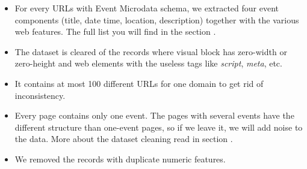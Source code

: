 \begin{itemize}
    \item For every URLs with Event Microdata schema, we extracted four event components (title, date time, location, description) together with the various web features. The full list you will find in the section . 
    \item The dataset is cleared of the records where visual block has zero-width or zero-height and web elements with the useless tags like \textit{script}, \textit{meta}, etc.
    \item It contains at most 100 different URLs for one domain to get rid of inconsistency. 
    \item Every page contains only one event. The pages with several events have the different structure than one-event pages, so if we leave it, we will add noise to the data. More about the dataset cleaning read in section .  
    \item We removed the records with duplicate numeric features.
\end{itemize}